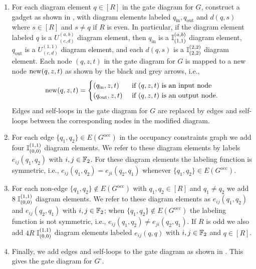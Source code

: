 \documentclass[../thesis-main/thesis-main]{subfiles}
\begin{document}
\begin{enumerate}
\item For each diagram element $q\in[R]$ in the gate diagram for $G$, construct a gadget as shown in , with diagram elements labeled $q_{\text{in}},q_{\text{out}}$ and $d(q,s)$ where $s\in[R]$ and $ s\neq q$ if $R$ is even.  In particular, if the diagram element labeled $q$ is a $U^{(a,b)}_{(c,d)}$ diagram element, then $q_{\text{in}}$ is a $\mathbb{I}^{(a,b)}_{(1,1)}$ diagram element, $q_{\text{out}}$ is a $U^{(1,1)}_{(c,d)}$ diagram element, and each $d(q,s)$ is a $\mathbb{I}^{(2,2)}_{(2,2)}$ diagram element.   Each node $(q,z,t)$ in the gate diagram for $G$ is mapped to a new node $\operatorname{new}(q,z,t)$ as shown by the black and grey arrows, i.e., 
\begin{equation}
  \operatorname{new}(q,z,t)=\begin{cases}
    (q_{\mathrm{in}},z,t) & \text{ if }(q,z,t)\text{ is an input node}\\
    (q_{\mathrm{out}},z,t) & \text{ if }(q,z,t)\text{ is an output node}.
  \end{cases}\label{eq:node_mapping_G_G_square}
\end{equation}
Edges and self-loops in the gate diagram for $G$ are replaced by edges and self-loops between the corresponding nodes in the modified diagram.

\item For each edge $\{q_{1},q_{2}\}\in E(G^{\text{occ}})$ in the occupancy constraints graph we add four $\mathbb{I}^{(1,1)}_{(0,0)}$ diagram elements.  We refer to these diagram elements by labels $e_{ij}(q_{1},q_{2})$ with $i,j\in\mathbb{F}_2$. For these diagram elements the labeling function is symmetric, i.e., $e_{ij}(q_{1},q_{2})=e_{ji}(q_{2},q_{1})$ whenever $\{q_{1},q_{2}\}\in E(G^{\text{occ}})$.

\item For each non-edge $\{q_{1},q_{2}\}\notin E(G^{\text{occ}})$ with $q_{1},q_{2}\in[R]$ and $q_{1}\neq q_{2}$ we add $8$ $\mathbb{I}^{(1,1)}_{(0,0)}$ diagram elements. We refer to these diagram elements as $e_{ij}(q_{1},q_{2})$ and $e_{ij}(q_{2},q_{1})$ with $i,j\in\mathbb{F}_2$; when $\{q_1,q_2\}\notin E(G^{\text{occ}})$ the labeling function is not symmetric, i.e., $e_{ij}(q_{1},q_{2})\neq e_{ji}(q_{2},q_{1})$. If $R$ is odd we also add $4R$ $\mathbb{I}^{(1,1)}_{(0,0)}$ diagram elements labeled $e_{ij}(q,q)$ with $i,j\in\mathbb{F}_2$ and $q\in[R]$.

\item Finally, we add edges and self-loops to the gate diagram as shown in . This gives the gate diagram for $G^{\square}$.
\end{enumerate}
\end{document}
